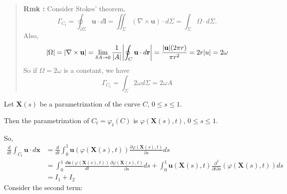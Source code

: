 \begin{quote}
	\textbf{Rmk :}
Consider Stokes' theorem,
\begin{equation}
\Gamma_{C_t} = \oint_{\partial \Sigma}\textbf{u}\cdot d\textbf{l}
= \iint_{\Sigma} (\nabla\times\textbf{u}) \cdot d\Sigma
= \int_{\Sigma} \Omega \cdot d\Sigma.
\end{equation}
Also,
\begin{equation}
\abs{\Omega} = \abs{\nabla\times\textbf{u}}
= \lim_{\delta A \to 0}\frac{1}{\abs{A}} \abs{\oint_{C} \textbf{u}\cdot d\textbf{r}}= \frac{\abs{\textbf{u}}(2\pi r)}{\pi r^2} = 2 r\abs{u} = 2\omega
\end{equation}
So if $\Omega = 2\omega$ is a constant, we have
\begin{equation}
\Gamma_{C_t} = \int_{\Sigma} 2\omega d\Sigma = 2\omega A
\end{equation}

\end{quote}

Let $\textbf{X}(s)$ be a parametrization of the curve $C$, $0\leq s\leq 1$.

Then the parametrization of $C_{t} = \varphi_{t}(C)$ is $\varphi(\textbf{X}(s),t)$, $0\leq s\leq 1$.

So,
\begin{equation}
\begin{aligned}
\frac{d}{dt} \int_{C_{t}} \textbf{u}\cdot d\textbf{x}
&= \frac{d}{dt} \int_{0}^{1} \textbf{u}\left(\varphi(\textbf{X}(s),t)\right) \frac{\partial \varphi(\textbf{X}(s),t)}{\partial s} ds\\
&= \int_{0}^{1} \frac{d\textbf{u}\left(\varphi(\textbf{X}(s),t)\right)}{dt} \frac{\partial \varphi(\textbf{X}(s),t)}{\partial s}ds
+ \int_{0}^{1} \textbf{u}(\textbf{X}(s),t) \frac{\partial^2}{\partial t\partial s}\left(\varphi(\textbf{X}(s),t)\right) ds\\
&= I_1 + I_2
\end{aligned}
\end{equation}
Consider the second term:



